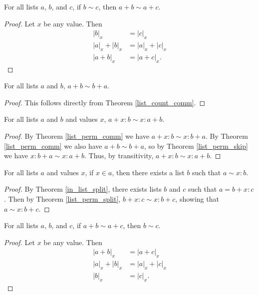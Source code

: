 \documentclass[../../math.tex]{subfiles}
\begin{document}
\begin{theorem} \label{list_perm_rpart}
    For all lists $a$, $b$, and $c$, if $b \sim c$, then $a + b \sim a + c$.
\end{theorem}
\begin{proof}
    Let $x$ be any value.  Then
    \begin{align*}
        |b|_x &= |c|_x \\
        |a|_x + |b|_x &= |a|_x + |c|_x \\
        |a + b|_x &= |a + c|_x.
    \end{align*}
\end{proof}

\begin{theorem} \label{list_perm_comm}
    For all lists $a$ and $b$, $a + b \sim b + a$.
\end{theorem}
\begin{proof}
    This follows directly from Theorem \ref{list_count_comm}.
\end{proof}

\begin{theorem} \label{list_perm_split}
    For all lists $a$ and $b$ and values $x$, $a + x : b \sim x : a + b$.
\end{theorem}
\begin{proof}
    By Theorem \ref{list_perm_comm} we have $a + x : b \sim x : b + a$.  By
    Theorem \ref{list_perm_comm} we also have $a + b \sim b + a$, so by Theorem
    \ref{list_perm_skip} we have $x : b + a \sim x : a + b$.  Thus, by
    transitivity, $a + x : b \sim x : a + b$.
\end{proof}

\begin{theorem} \label{list_split_perm}
    For all lists $a$ and values $x$, if $x \in a$, then there exists a list $b$
    such that $a \sim x : b$.
\end{theorem}
\begin{proof}
    By Theorem \ref{in_list_split}, there exists lists $b$ and $c$ such that $a
    = b + x : c$.  Then by Theorem \ref{list_perm_split}, $b + x : c \sim x : b
    + c$, showing that $a \sim x : b + c$.
\end{proof}

\begin{theorem} \label{list_perm_conc_lcancel}
    For all lists $a$, $b$, and $c$, if $a + b \sim a + c$, then $b \sim c$.
\end{theorem}
\begin{proof}
    Let $x$ be any value.  Then
    \begin{align*}
        |a + b|_x &= |a + c|_x \\
        |a|_x + |b|_x &= |a|_x + |c|_x \\
        |b|_x &= |c|_x.
    \end{align*}
\end{proof}
\end{document}
